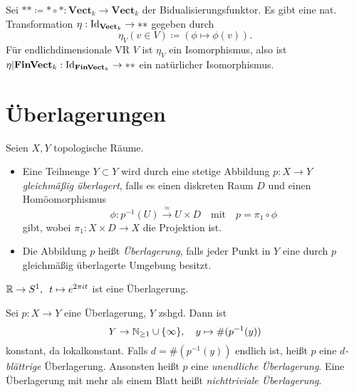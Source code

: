 \documentclass{cheat-sheet}
\begin{document}
\begin{samepage}

\begin{bsp}
  Sei $** \coloneqq * \circ * : \mathbf{Vect}_k \to \mathbf{Vect}_k$ der Bidualisierungsfunktor. Es gibt eine nat. Transformation $\eta : \mathrm{Id}_{\mathbf{Vect}_k} \to **$ gegeben durch
  \[ \eta_V(v \in V) \coloneqq (\phi \mapsto \phi(v)). \]
  Für endlichdimensionale VR $V$ ist $\eta_V$ ein Isomorphismus, also ist $\eta|\mathbf{FinVect}_k : \mathrm{Id}_{\mathbf{FinVect}_k} \to **$ ein natürlicher Isomorphismus.
\end{bsp}


\section{Überlagerungen}


\begin{defn}
  Seien $X, Y$ topologische Räume.
  \begin{itemize}
    \item Eine Teilmenge $Y \subset Y$ wird durch eine stetige Abbildung $p : X \to Y$ \emph{gleichmäßig überlagert}, falls es einen diskreten Raum $D$ und einen Homöomorphismus
    \[
      \phi : p^{-1}(U) \xrightarrow{\approx} U \times D
      \quad \text{mit} \quad
      p = \pi_1 \circ \phi
    \]
    gibt, wobei $\pi_1 : X \times D \to X$ die Projektion ist.
    \item Die Abbildung $p$ heißt \emph{Überlagerung}, falls jeder Punkt in $Y$ eine durch $p$ gleichmäßig überlagerte Umgebung besitzt.
  \end{itemize}
\end{defn}

\end{samepage}

\begin{bsp}
  $\mathbb{R} \to S^1, \enspace t \mapsto e^{2 \pi it}$ ist eine Überlagerung.
\end{bsp}

\begin{bem}
  Sei $p : X \to Y$ eine Überlagerung, $Y$ zshgd. Dann ist
  \[ Y \to \mathbb{N}_{\geq 1} \cup \{ \infty \}, \quad y \mapsto \text{\#} (p^{-1}(y)) \]
  konstant, da lokalkonstant.
  Falls $d = \text{\#} (p^{-1}(y))$ endlich ist, heißt $p$ eine \emph{$d$-blättrige} Überlagerung. Ansonsten heißt $p$ eine \emph{unendliche Überlagerung}. Eine Überlagerung mit mehr als einem Blatt heißt \emph{nichttriviale Überlagerung}.
\end{bem}
\end{document}
